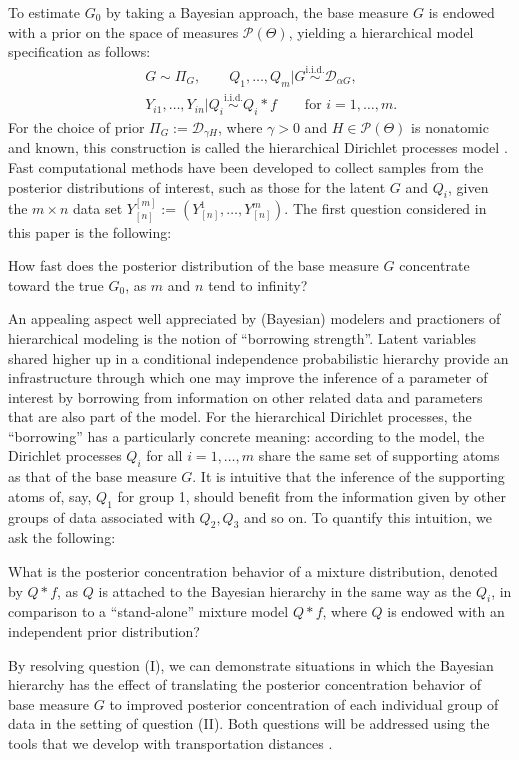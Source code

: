 \documentclass[MSNbibl,number,citesort]{arxbj}
\newcommand{\Pcal}{\mathscr{P}}
\newcommand{\DP}{\mathscr{D}}
\newcommand{\YYn}{Y_{[n]}}
\begin{document}
To estimate $G_0$ by taking a Bayesian approach, the base measure $G$
is endowed
with a prior on the space of measures $\Pcal(\Theta)$, yielding
a hierarchical model specification as follows:
%
%
\begin{eqnarray}
\label{Eqn-HM-1}&& G \sim\Pi_G,\qquad  Q_1,\ldots, Q_m
| G \stackrel{\mathrm{i.i.d.}} {\sim} \DP_{\alpha G},
\\
\label{Eqn-HM-2}&& Y_{i1},\ldots,Y_{in} | Q_i
\stackrel{\mathrm{i.i.d.}} {\sim} Q_i*f \qquad\mbox{for } i=1,\ldots,m.
\end{eqnarray}
%
For the choice of prior $\Pi_G := \DP_{\gamma H}$,
where $\gamma> 0$ and $H\in\Pcal(\Theta)$ is nonatomic and known,
this construction
is called the hierarchical Dirichlet processes model \cite{Teh-etal-06}.
Fast computational
methods have been developed to collect samples from the posterior
distributions of interest, such as those for the latent $G$ and $Q_i$,
given the $m\times n$ data set $\YYn^{[m]}:= (\YYn^1,\ldots,\YYn^m)$.
%
The first question considered in this paper is the following:
%
\begin{longlist}[(I)]
%
\item[(I)] How fast does the posterior distribution of the base
measure $G$
concentrate toward the true $G_0$, as $m$ and $n$ tend to infinity?
\end{longlist}

An appealing aspect well appreciated by
(Bayesian) modelers and practioners of hierarchical modeling is
the notion of ``borrowing strength''. Latent
variables shared higher up in a conditional independence
probabilistic hierarchy
provide an infrastructure through which one may improve the inference
of a parameter
of interest by borrowing from information on other related data and
parameters that are also part of the model.
For the hierarchical Dirichlet processes, the ``borrowing''
has a particularly concrete meaning: according to
the model, the Dirichlet processes $Q_i$ for all $i=1,\ldots,m$ share
the same set of supporting atoms as that of the base measure $G$. It is
intuitive that the inference of the supporting atoms of, say, $Q_1$ for
group 1,
should benefit from the information given by other groups of data associated
with $Q_2, Q_3$ and so on.
To quantify this intuition, we ask the following:
%
\begin{longlist}[(II)]
%
\item[(II)] What is the posterior concentration behavior
of a mixture distribution, denoted by $Q*f$, as $Q$ is attached
to the Bayesian hierarchy in the same way as the $Q_i$,
in comparison to a ``stand-alone'' mixture model $Q*f$,
where $Q$ is endowed with an independent prior distribution?
\end{longlist}
%
By resolving question (I), we can demonstrate
situations in which the Bayesian hierarchy has the effect of translating
the posterior concentration behavior of base measure $G$
to improved posterior concentration of each individual group of data
in the setting of question (II).
Both questions will be addressed
using the tools that we develop with transportation distances \cite
{Villani-08}.
\end{document}
